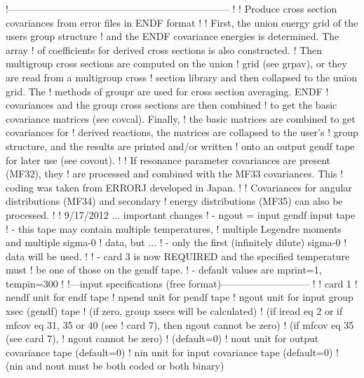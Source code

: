 \newpage
\small
\begin{ccode}

   !--------------------------------------------------------------------
   !
   ! Produce cross section covariances from error files in ENDF format
   !
   ! First, the union energy grid of the users group structure
   ! and the ENDF covariance energies is determined.  The array
   ! of coefficients for derived cross sections is also constructed.
   ! Then multigroup cross sections are computed on the union
   ! grid (see grpav), or they are read from a multigroup cross
   ! section library and then collapsed to the union grid.  The
   ! methods of groupr are used for cross section averaging.  ENDF
   ! covariances and the group cross sections are then combined
   ! to get the basic covariance matrices (see covcal).  Finally,
   ! the basic matrices are combined to get covariances for
   ! derived reactions, the matrices are collapsed to the user's
   ! group structure, and the results are printed and/or written
   ! onto an output gendf tape for later use (see covout).
   !
   ! If resonance parameter covariances are present (MF32), they
   ! are processed and combined with the MF33 covariances.  This
   ! coding was taken from ERRORJ developed in Japan.
   !
   ! Covariances for angular distributions (MF34) and secondary
   ! energy distributions (MF35) can also be processed.
   !
   ! 9/17/2012 ... important changes
   ! - ngout = input gendf input tape
   !           -  this tape may contain multiple temperatures,
   !              multiple Legendre moments and multiple sigma-0
   !              data, but ...
   !              - only the first (infinitely dilute) sigma-0
   !                data will be used.
   !
   ! - card 3 is now REQUIRED and the specified temperature must
   !   be one of those on the gendf tape.
   !   - default values are mprint=1, tempin=300
   !
   !---input specifications (free format)---------------------------
   !
   !  card 1
   !    nendf   unit for endf tape
   !    npend   unit for pendf tape
   !    ngout   unit for input group xsec (gendf) tape
   !            (if zero, group xsecs will be calculated)
   !            (if iread eq 2 or if mfcov eq 31, 35 or 40 (see
   !             card 7), then ngout cannot be zero)
   !            (if mfcov eq 35 (see card 7),
   !              ngout cannot be zero)
   !            (default=0)
   !    nout    unit for output covariance tape (default=0)
   !    nin     unit for input covariance tape (default=0)
   !            (nin and nout must be both coded or both binary)

\end{ccode}
